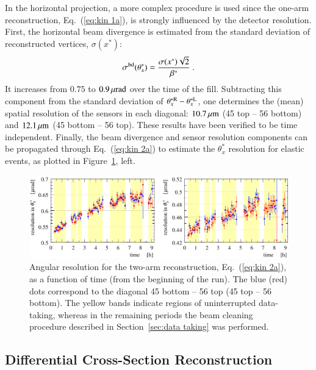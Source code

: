 In the horizontal projection, a more complex procedure is used since the one-arm reconstruction, Eq.~(\ref{eq:kin 1a}), is strongly influenced by the detector resolution. First, the horizontal beam divergence is estimated from the standard deviation of reconstructed vertices, $\sigma(x^*)$:
\begin{equation}
\label{eq:beam div from vertex}
\sigma^{\rm bd}(\theta_x^*) = {\sigma(x^*) \sqrt 2\over \beta^*}\ .
\end{equation}
It increases from $0.75$ to $0.9\,{\rm \mu rad}$ over the time of the fill. Subtracting this component from the standard deviation of $\theta_x^{*\rm R} - \theta_x^{*\rm L}$, one determines the (mean) spatial resolution of the sensors in each diagonal: $10.7\,{\rm \mu m}$ (45 top -- 56 bottom) and $12.1\,{\rm \mu m}$ (45 bottom -- 56 top). These results have been verified to be time independent. Finally, the beam divergence and sensor resolution components can be propagated through Eq.~({\ref{eq:kin 2a}}) to estimate the $\theta_x^*$ resolution for elastic events, as plotted in Figure~\ref{fig:resol final}, left.


\begin{figure}
\begin{center}
\includegraphics{fig/resolutions_vs_time.pdf}
\caption{%
Angular resolution for the two-arm reconstruction, Eq.~(\ref{eq:kin 2a}), as a function of time (from the beginning of the run). The blue (red) dots correspond to the diagonal 45 bottom -- 56 top (45 top -- 56 bottom). The yellow bands indicate regions of uninterrupted data-taking, whereas in the remaining periods the beam cleaning procedure described in Section~\ref{sec:data taking} was performed.
}
\label{fig:resol final}
\end{center}
\end{figure}

\subsection{Differential Cross-Section Reconstruction}
\label{sec:diff cs}

